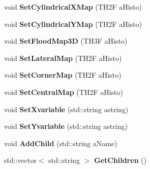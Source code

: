 \begin{DoxyCompactItemize}
\item 
\hypertarget{classElement_abcdb076f522e0e679003d92ea549fe85}{void {\bfseries Set\+Cylindrical\+X\+Map} (T\+H2\+F a\+Histo)}\label{classElement_abcdb076f522e0e679003d92ea549fe85}

\item 
\hypertarget{classElement_a46aabe074a344e8a0a31eff4e9fbfd32}{void {\bfseries Set\+Cylindrical\+Y\+Map} (T\+H2\+F a\+Histo)}\label{classElement_a46aabe074a344e8a0a31eff4e9fbfd32}

\item 
\hypertarget{classElement_a0cba0637b48af6109844ab470084d861}{void {\bfseries Set\+Flood\+Map3\+D} (T\+H3\+F a\+Histo)}\label{classElement_a0cba0637b48af6109844ab470084d861}

\item 
\hypertarget{classElement_a50762fc0cc57a191f09f50049be2ac0e}{void {\bfseries Set\+Lateral\+Map} (T\+H2\+F a\+Histo)}\label{classElement_a50762fc0cc57a191f09f50049be2ac0e}

\item 
\hypertarget{classElement_aabc88cb1a289df02cc74f17a7fc8992e}{void {\bfseries Set\+Corner\+Map} (T\+H2\+F a\+Histo)}\label{classElement_aabc88cb1a289df02cc74f17a7fc8992e}

\item 
\hypertarget{classElement_a207f6ae9fd0afda9c7dd6d6273ffc0ba}{void {\bfseries Set\+Central\+Map} (T\+H2\+F a\+Histo)}\label{classElement_a207f6ae9fd0afda9c7dd6d6273ffc0ba}

\item 
\hypertarget{classElement_acb619fc989012adef1de6f79639f0f77}{void {\bfseries Set\+Xvariable} (std\+::string astring)}\label{classElement_acb619fc989012adef1de6f79639f0f77}

\item 
\hypertarget{classElement_aca1f8fb595b4d35c482bc1ebc7eee4d6}{void {\bfseries Set\+Yvariable} (std\+::string astring)}\label{classElement_aca1f8fb595b4d35c482bc1ebc7eee4d6}

\item 
\hypertarget{classElement_a18af20eae501f4e74e17663f5295e842}{void {\bfseries Add\+Child} (std\+::string a\+Name)}\label{classElement_a18af20eae501f4e74e17663f5295e842}

\item 
\hypertarget{classElement_ab027b4d21940058225371012e3e9ce37}{std\+::vector$<$ std\+::string $>$ {\bfseries Get\+Children} ()}\label{classElement_ab027b4d21940058225371012e3e9ce37}


\end{DoxyCompactItemize}
